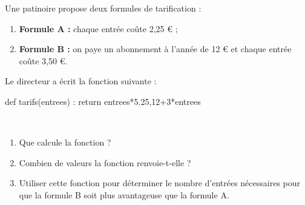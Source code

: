 \documentclass[a4paper,11pt,french]{article}
\begin{document}
Une patinoire propose deux formules de tarification :
\begin{enumerate}[\textbullet]
	\item 	\textbf{Formule A :} chaque entrée coûte 2,25 € ;
	\item 	\textbf{Formule B :} on paye un abonnement à l’année de 12 € et chaque entrée coûte 3,50 €.
\end{enumerate}
\begin{minipage}{9cm}
	Le directeur a écrit la fonction  suivante :
	\begin{pythoncode}
def tarifs(entrees) :
   return entrees*5.25,12+3*entrees
	\end{pythoncode}
\end{minipage}
\begin{minipage}{1cm}
	\hspace{.5cm}\\
	
\end{minipage}
\begin{minipage}{7cm}
	\begin{enumerate}[\bfseries 1.]
		\item 	Que calcule la fonction  ?
		\item 	Combien de valeurs la fonction  renvoie-t-elle ?
		\item 	Utiliser cette fonction pour déterminer le nombre d’entrées nécessaires pour que la formule B soit plus avantageuse que la formule A.
	\end{enumerate}
\end{minipage}
\end{document}
